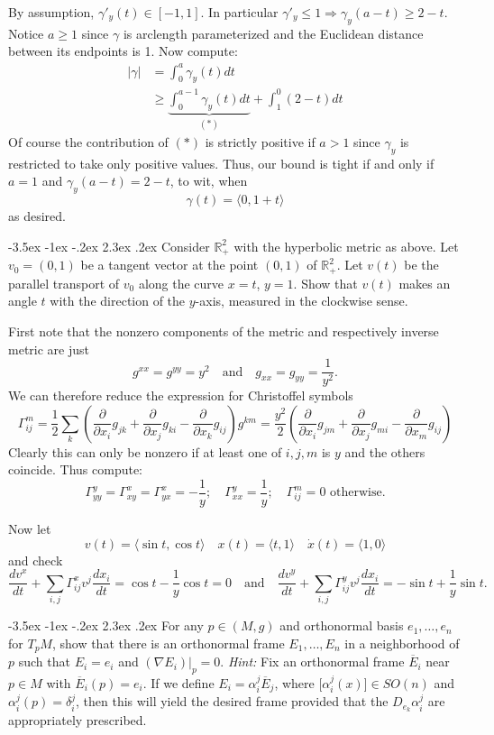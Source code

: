 \documentclass[10pt]{article}
\makeatletter
\renewcommand\section{\@startsection{section}{1}{\z@}%
                                  {-3.5ex \@plus -1ex \@minus -.2ex}%
                                  {2.3ex \@plus.2ex}%
                                  {\normalfont\large\bfseries}}
\newcommand{\R}{{\ensuremath{\mathbb{R}}} }
\newcommand{\del}{{\ensuremath{\partial}} }
\newcommand{\xt}[2]{\ensuremath{\Gamma^{#1}_{#2}}}
\newcommand{\hint}[1]{{\emph{Hint:} #1}} %
\makeatother
\begin{document}
By assumption, $\gamma'_y(t) \in [-1,1]$. In particular $\gamma'_y \leq 1 \Rightarrow \gamma_y(a-t) \geq 2 -t$. Notice $a \geq 1$ since $\gamma$ is arclength parameterized and the Euclidean distance between its endpoints is 1. Now compute:
\begin{align*}|\gamma| &=  \int_0^a \gamma_y(t) dt \\ & \geq \underbrace{\int_0^{a-1}\gamma_y(t) dt}_{(*)} + \int_1^0(  2-t ) dt  \end{align*}
Of course the contribution of $(*)$ is strictly positive if $a >1$ since $\gamma_y$ is restricted to take only positive values. Thus, our bound is tight if and only if $a = 1$ and $\gamma_y(a-t) = 2- t$, to wit, when
\[\gamma(t) =  \langle 0, 1 +t \rangle\]
as desired.

\section{Consider $\R_+^2$ with the hyperbolic metric as above. Let $v_0 = (0,1)$ be a tangent vector at the point $(0,1)$ of $\R_+^2$. Let $v(t)$ be the parallel transport of $v_0$ along the curve $x=t$, $y=1$. Show that $v(t)$ makes an angle $t$ with the direction of the $y$-axis, measured in the clockwise sense.}

First note that the nonzero components of the metric and respectively inverse metric are just
\[ g^{xx} = g^{yy} = y^2 \quad \mbox{and} \quad g_{xx} = g_{yy} = \frac{1}{y^2}.\]
We can therefore reduce the expression for Christoffel symbols
\[ \xt{m}{ij} = \frac{1}{2} \sum_k \left( \frac{\del}{\del x_i } g_{jk} + \frac{\del}{\del x_j}g_{ki} - \frac{\del}{\del x_k} g_{ij} \right) g^{km} = \frac{y^2}{2}  \left( \frac{\del}{\del x_i } g_{jm} + \frac{\del}{\del x_j}g_{mi} - \frac{\del}{\del x_m} g_{ij} \right)\]
Clearly this can only be nonzero if at least one of $i,j,m$ is $y$ and the others coincide. Thus compute:
\[\xt{y}{yy} =\xt{x}{xy} =\xt{x}{yx} = - \frac{1}{y}; \quad \xt{y}{xx} = \frac{1}{y}; \quad \xt{m}{ij} = 0   \mbox{ otherwise} .\]

Now let 
\[v(t) = \langle \sin t, \cos t \rangle \quad x(t) = \langle t, 1 \rangle \quad \dot{x}(t) =\langle 1 , 0 \rangle \]
and check
\[\frac{dv^x}{dt } + \sum_{i,j} \xt{x}{ij} v^j \frac{dx_i}{dt} = \cos t - \frac{1}{y} \cos t = 0 \quad \mbox{and} \quad\frac{dv^y}{dt } + \sum_{i,j} \xt{y}{ij} v^j \frac{dx_i}{dt} = - \sin t + \frac{1}{y} \sin t.\]

\section{For any $p \in (M,g)$ and orthonormal basis $e_1, \dots, e_n$ for $T_p M$, show that there is an orthonormal frame $E_1, \dots, E_n$ in a neighborhood of $p$ such that $E_i = e_i$ and $(\nabla E_i)|_p = 0 $. \hint{Fix an orthonormal frame $\overline{E}_i$ near $p \in M$ with $\overline{E}_i(p) = e_i$. If we define $E_i = \alpha_i^j \overline{E}_j$, where [$\alpha_i^j (x)$]$\in SO(n)$ and $\alpha_i^j(p) = \delta_i^j$, then this will yield the desired frame provided that the $D_{e_k} \alpha_i^j$ are appropriately prescribed. }}
\end{document}
